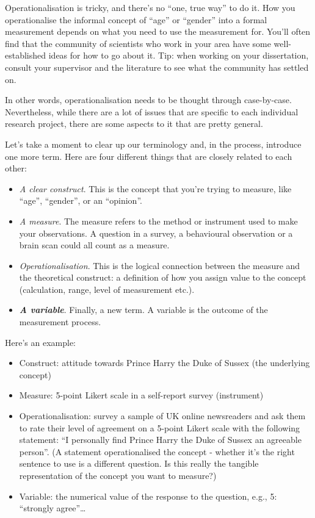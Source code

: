 \documentclass[
  11pt,
]{book}
\providecommand{\tightlist}{%
  \setlength{\itemsep}{0pt}\setlength{\parskip}{0pt}}
\theoremstyle{indenteddefinition}
\theoremstyle{indenteddefinition}
\theoremstyle{definition}
\theoremstyle{definition}
\theoremstyle{remark}
\begin{document}
Operationalisation is tricky, and there's no ``one, true way'' to do it. How you operationalise the informal concept of ``age'' or ``gender'' into a formal measurement depends on what you need to use the measurement for. You'll often find that the community of scientists who work in your area have some well-established ideas for how to go about it. Tip: when working on your dissertation, consult your supervisor and the literature to see what the community has settled on.

In other words, operationalisation needs to be thought through case-by-case. Nevertheless, while there are a lot of issues that are specific to each individual research project, there are some aspects to it that are pretty general.

Let's take a moment to clear up our terminology and, in the process, introduce one more term. Here are four different things that are closely related to each other:

\begin{itemize}
\tightlist
\item
  \emph{A clear construct}. This is the concept that you're trying to measure, like ``age'', ``gender'', or an ``opinion''.
\item
  \emph{A measure}. The measure refers to the method or instrument used to make your observations. A question in a survey, a behavioural observation or a brain scan could all count as a measure.
\item
  \emph{Operationalisation}. This is the logical connection between the measure and the theoretical construct: a definition of how you assign value to the concept (calculation, range, level of measurement etc.).
\item
  \textbf{\emph{A variable}}. Finally, a new term. A variable is the outcome of the measurement process.
\end{itemize}

Here's an example:

\begin{itemize}
\tightlist
\item
  Construct: attitude towards Prince Harry the Duke of Sussex (the underlying concept)
\item
  Measure: 5-point Likert scale in a self-report survey (instrument)
\item
  Operationalisation: survey a sample of UK online newsreaders and ask them to rate their level of agreement on a 5-point Likert scale with the following statement: ``I personally find Prince Harry the Duke of Sussex an agreeable person''. (A statement operationalised the concept - whether it's the right sentence to use is a different question. Is this really the tangible representation of the concept you want to measure?)
\item
  Variable: the numerical value of the response to the question, e.g., 5: ``strongly agree''\ldots{}
\end{itemize}
\end{document}
